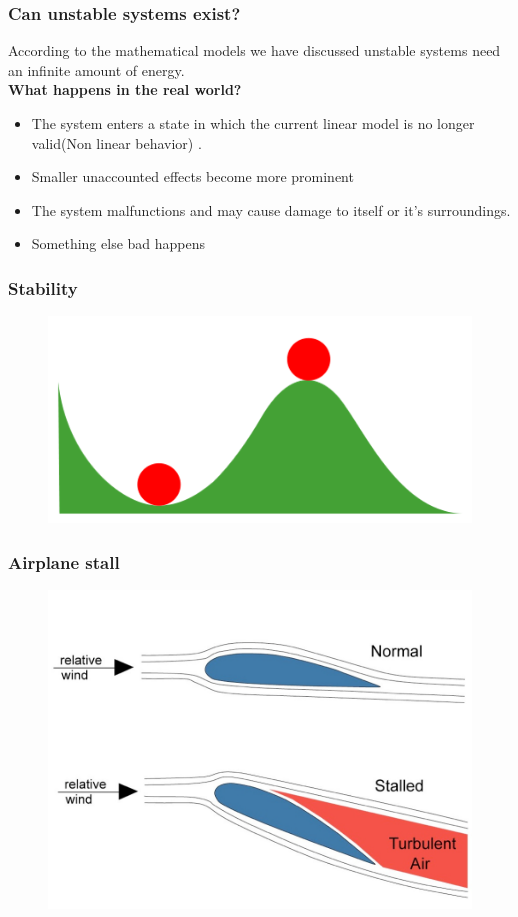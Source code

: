 \begin{frame}
	\frametitle{Can unstable systems exist?}
	According to the mathematical models we have discussed unstable systems need an infinite amount of energy.\\
	\textbf{What happens in the real world?}
	\begin{itemize}
		\item The system enters a state in which the current linear model is no longer valid(Non linear behavior) .
		\item Smaller unaccounted effects become more prominent
		\item The system malfunctions and may cause damage to itself or it’s surroundings.
		\item Something else bad happens
	\end{itemize}
\end{frame}
\begin{frame}
	\frametitle{Stability}
	\begin{figure}
	\centering
	\includegraphics[width=0.7\linewidth]{Images/discrete_time_systems_29}
	\label{fig:discrete_time_systems_29}
	\end{figure}

\end{frame}
\begin{frame}
	\frametitle{Airplane stall}
	\begin{figure}
		\centering
		\includegraphics[height=0.7\textheight]{Images/discrete_time_systems_30}
		\label{fig:discrete_time_systems_30}
	\end{figure}
\end{frame}
